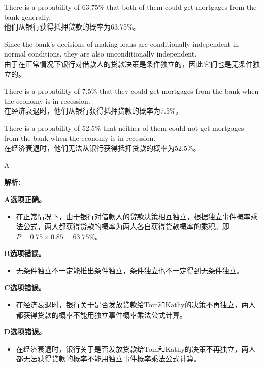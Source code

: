 \documentclass{article}
\newenvironment{explanation}
{\textbf{解析:}\par}
{\par}
\begin{document}
    \begin{choices}
        \item There is a probability of 63.75\% that both of them could get mortgages from the bank generally.\\
        他们从银行获得抵押贷款的概率为63.75\%。
        \item Since the bank’s decisions of making loans are conditionally independent in normal conditions, they are also unconditionally independent.\\
        由于在正常情况下银行对借款人的贷款决策是条件独立的，因此它们也是无条件独立的。
        \item There is a probability of 7.5\% that they could get mortgages from the bank when the economy is in recession.\\
        在经济衰退时，他们从银行获得抵押贷款的概率为7.5\%。
        \item There is a probability of 52.5\% that neither of them could not get mortgages from the bank when the economy is in recession.\\
        在经济衰退时，他们无法从银行获得抵押贷款的概率为52.5\%。
    \end{choices}
    
    \begin{correctanswer}
    A
    \end{correctanswer}
    
    \begin{explanation}
    \textbf{A选项正确。}
    \begin{itemize}
    \item 在正常情况下，由于银行对借款人的贷款决策相互独立，根据独立事件概率乘法公式，两人都获得贷款的概率为两人各自获得贷款概率的乘积。即\(P = 0.75\times0.85=63.75\%\)。
    \end{itemize}
    \textbf{B选项错误。}
    \begin{itemize}
    \item 无条件独立不一定能推出条件独立，条件独立也不一定得到无条件独立。
    \end{itemize}
    \textbf{C选项错误。}
    \begin{itemize}
    \item 在经济衰退时，银行关于是否发放贷款给Tom和Kathy的决策不再独立，两人都获得贷款的概率不能用独立事件概率乘法公式计算。
    \end{itemize}
    \textbf{D选项错误。}
    \begin{itemize}
    \item 在经济衰退时，银行关于是否发放贷款给Tom和Kathy的决策不再独立，两人都无法获得贷款的概率不能用独立事件概率乘法公式计算。
    \end{itemize}
    \end{explanation}
    
\end{document}
